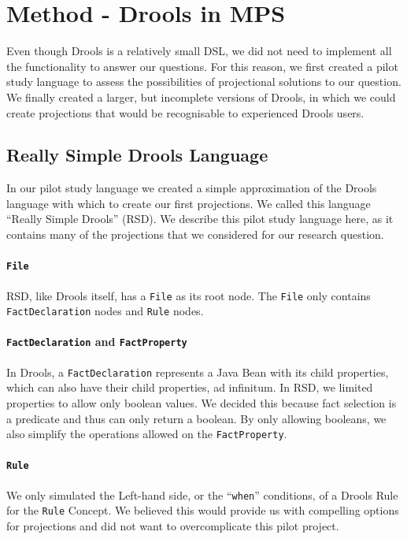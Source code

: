 \section{Method - Drools in MPS}
\label{section:dsr_method}

Even though Drools is a relatively small DSL, we did not need to implement all the functionality to answer our questions.
For this reason, we first created a pilot study language to assess the possibilities of projectional solutions to our question.
We finally created a larger, but incomplete versions of Drools, in which we could create projections that would be recognisable to experienced Drools users.

\subsection{Really Simple Drools Language}
In our pilot study language we created a simple approximation of the Drools language with which to create our first projections.
We called this language ``Really Simple Drools'' (RSD).
We describe this pilot study language here, as it contains many of the projections that we considered for our research question.

\paragraph{\texttt{File}} RSD, like Drools itself, has a \texttt{File} as its root node.
The \texttt{File} only contains \texttt{FactDeclaration} nodes and \texttt{Rule} nodes.

\paragraph{\texttt{FactDeclaration} and \texttt{FactProperty}} In Drools, a \texttt{FactDeclaration} represents a Java Bean with its child properties, which can also have their child properties, ad infinitum.
In RSD, we limited properties to allow only boolean values.
We decided this because fact selection is a predicate and thus can only return a boolean.
By only allowing booleans, we also simplify the operations allowed on the \texttt{FactProperty}.

\paragraph{\texttt{Rule}} We only simulated the Left-hand side, or the ``\texttt{when}'' conditions, of a Drools Rule for the \texttt{Rule} Concept.
We believed this would provide us with compelling options for projections and did not want to overcomplicate this pilot project.


